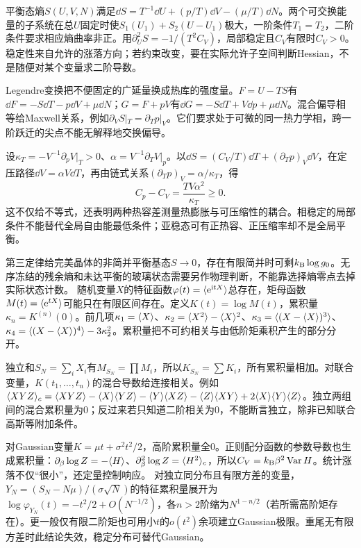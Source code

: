 \label{ch:thermo}
平衡态熵$S(U,V,N)$满足$\dd S=T^{-1}\dd U+(p/T)\dd V-(\mu/T)\dd N$。两个可交换能量的子系统在总$U$固定时使$S_1(U_1)+S_2(U-U_1)$极大，一阶条件$T_1=T_2$，二阶条件要求相应熵曲率非正。用$\partial_U^2S=-1/(T^2C_V)$，局部稳定且$C_V$有限时$C_V>0$。稳定性来自允许的涨落方向；若约束改变，要在实际允许子空间判断Hessian，不是随便对某个变量求二阶导数。

Legendre变换把不便固定的广延量换成热库的强度量。$F=U-TS$有$\dd F=-S\dd T-p\dd V+\mu\dd N$；$G=F+pV$有$\dd G=-S\dd T+V\dd p+\mu\dd N$。混合偏导相等给Maxwell关系，例如$\partial_VS|_T=\partial_Tp|_V$。它们要求处于可微的同一热力学相，跨一阶跃迁的尖点不能无解释地交换偏导。

设$\kappa_T=-V^{-1}\partial_pV|_T>0$、$\alpha=V^{-1}\partial_TV|_p$。以$\dd S=(C_V/T)\dd T+(\partial_Tp)_V\dd V$，在定压路径$\dd V=\alpha V\dd T$，再由链式关系$(\partial_Tp)_V=\alpha/\kappa_T$，得
\begin{equation}
C_p-C_V=\frac{TV\alpha^2}{\kappa_T}\ge0.
\end{equation}
这不仅给不等式，还表明两种热容差测量热膨胀与可压缩性的耦合。相稳定的局部条件不能替代全局自由能最低条件；亚稳态可有正热容、正压缩率却不是全局平衡。

第三定律给完美晶体的非简并平衡基态$S\to0$，存在有限简并时可剩$k_{\mathrm B}\log g_0$。无序冻结的残余熵和未达平衡的玻璃状态需要另作物理判断，不能靠选择熵零点去掉实际状态计数。
随机变量$X$的特征函数$\varphi(t)=\langle \mathrm e^{\mathrm i tX}\rangle$总存在，矩母函数$M(t)=\langle \mathrm e^{tX}\rangle$可能只在有限区间存在。定义$K(t)=\log M(t)$，累积量$\kappa_n=K^{(n)}(0)$。前几项$\kappa_1=\langle X\rangle$、$\kappa_2=\langle X^2\rangle-\langle X\rangle^2$、$\kappa_3=\langle (X-\langle X\rangle)^3\rangle$、$\kappa_4=\langle (X-\langle X\rangle)^4\rangle-3\kappa_2^2$。累积量把不可约相关与由低阶矩乘积产生的部分分开。

独立和$S_N=\sum_iX_i$有$M_{S_N}=\prod M_i$，所以$K_{S_N}=\sum K_i$，所有累积量相加。对联合变量，$K(t_1,\ldots,t_n)$的混合导数给连接相关。例如$\langle XYZ\rangle_c=\langle XYZ\rangle-\langle X\rangle\langle YZ\rangle-\langle Y\rangle\langle XZ\rangle-\langle Z\rangle\langle XY\rangle+2\langle X\rangle\langle Y\rangle\langle Z\rangle$。独立两组间的混合累积量为0；反过来若只知道二阶相关为0，不能断言独立，除非已知联合高斯等附加条件。

对Gaussian变量$K=\mu t+\sigma^2t^2/2$，高阶累积量全0。正则配分函数的参数导数也生成累积量：$\partial_\beta\log Z=-\langle H\rangle$、$\partial_\beta^2\log Z=\langle H^2\rangle_c$，所以$C_V=k_{\mathrm B}\beta^2\operatorname{Var}H$。统计涨落不仅“很小”，还定量控制响应。
对独立同分布且有限方差的变量，$Y_N=(S_N-N\mu)/(\sigma\sqrt N)$的特征累积量展开为$\log\varphi_{Y_N}(t)=-t^2/2+O(N^{-1/2})$，各$n>2$阶缩为$N^{1-n/2}$（若所需高阶矩存在）。更一般仅有限二阶矩也可用小$t$的$o(t^2)$余项建立Gaussian极限。重尾无有限方差时此结论失效，稳定分布可替代Gaussian。

